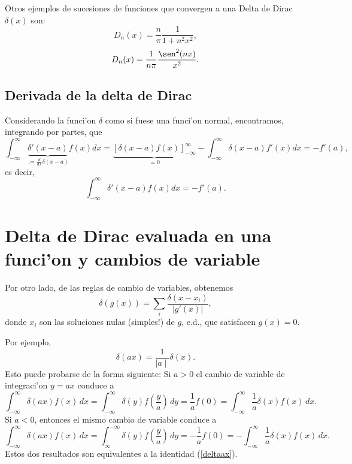 Otros ejemplos de sucesiones de funciones que convergen a una Delta de Dirac $\delta(x)$ son:
\begin{equation}
D_n(x)=\frac{n}{\pi}\frac{1}{1+n^2x^2},
\end{equation}
\begin{equation}
D_n(x)=\frac{1}{n\pi}\frac{\sen^2(nx)}{x^2}.
\end{equation}


\subsection{Derivada de la delta de Dirac}

Considerando la funci'on $\delta$ como si fuese una funci'on normal,
encontramos, integrando por partes, que
\begin{equation}
  \int_{-\infty}^{\infty}\underbrace{\delta'(x-a)}_{:=\frac{d}{dx}
   \delta(x-a)} f(x)d x =\underbrace{[\delta(x-a)
   f(x)]_{-\infty}^{\infty}}_{=0}
  -\int_{-\infty}^{\infty}\delta(x-a)f'(x)d x = -f'(a),
 \end{equation}
es decir,
\begin{equation}
  \int_{-\infty}^{\infty}\delta'(x-a) f(x) d x = -f'(a).
 \end{equation}

\section{Delta de Dirac evaluada en una funci'on y cambios de variable}
Por otro lado, de las reglas de cambio de variables, obtenemos
\begin{equation}
\boxed{  \delta(g(x)) = \sum_i\frac{\delta(x-x_i)}{\left|g'(x)\right|},}
 \end{equation}
 donde $x_i$ son las soluciones nulas (simples!) de $g$, e.d., que satisfacen
$g(x)=0$.

Por ejemplo,
\begin{equation}
\boxed{\delta(a x) = \frac{1}{\mid a \mid} \delta(x).}\label{deltaax}
\end{equation}
Esto puede probarse de la forma siguiente: Si $a > 0$ el cambio de variable de
integraci'on $y = a x$ conduce a
\begin{equation}
\int_{- \infty}^{\infty} \delta(a x) f(x)\,d x =
\int_{- \infty}^{\infty} \delta(y) f(\frac{y}{a})\,dy = \frac{1}{a} f(0) =
\int_{- \infty}^{\infty} \frac{1}{a} \delta(x) f(x) \,dx.
\end{equation}
Si $a < 0$, entonces el mismo cambio de variable conduce a
\begin{equation}
\int_{- \infty}^{\infty} \delta(a x) f(x)\,dx =
\int_{\infty}^{- \infty} \delta(y) f(\frac{y}{a})\,dy = - \frac{1}{a} f(0) =
- \int_{- \infty}^{\infty} \frac{1}{a} \delta(x) f(x)\,dx.
\end{equation}
Estos dos resultados son equivalentes a la identidad (\ref{deltaax}).

